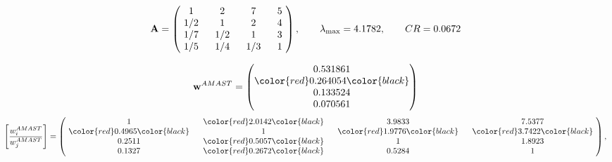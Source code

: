 \begin{example}
\begin{equation*}
\mathbf{A} =
\begin{pmatrix}
$\,\,$ 1 $\,\,$ & $\,\,$2$\,\,$ & $\,\,$7$\,\,$ & $\,\,$5 $\,\,$ \\
$\,\,$ 1/2$\,\,$ & $\,\,$ 1 $\,\,$ & $\,\,$2$\,\,$ & $\,\,$4 $\,\,$ \\
$\,\,$ 1/7$\,\,$ & $\,\,$ 1/2$\,\,$ & $\,\,$ 1 $\,\,$ & $\,\,$3 $\,\,$ \\
$\,\,$ 1/5$\,\,$ & $\,\,$ 1/4$\,\,$ & $\,\,$ 1/3$\,\,$ & $\,\,$ 1  $\,\,$ \\
\end{pmatrix},
\qquad
\lambda_{\max} =
4.1782,
\qquad
CR = 0.0672
\end{equation*}

\begin{equation*}
\mathbf{w}^{AMAST} =
\begin{pmatrix}
0.531861\\
\color{red} 0.264054\color{black} \\
0.133524\\
0.070561
\end{pmatrix}\end{equation*}
\begin{equation*}
\left[ \frac{{w}^{AMAST}_i}{{w}^{AMAST}_j} \right] =
\begin{pmatrix}
$\,\,$ 1 $\,\,$ & $\,\,$\color{red} 2.0142\color{black} $\,\,$ & $\,\,$3.9833$\,\,$ & $\,\,$7.5377$\,\,$ \\
$\,\,$\color{red} 0.4965\color{black} $\,\,$ & $\,\,$ 1 $\,\,$ & $\,\,$\color{red} 1.9776\color{black} $\,\,$ & $\,\,$\color{red} 3.7422\color{black}   $\,\,$ \\
$\,\,$0.2511$\,\,$ & $\,\,$\color{red} 0.5057\color{black} $\,\,$ & $\,\,$ 1 $\,\,$ & $\,\,$1.8923 $\,\,$ \\
$\,\,$0.1327$\,\,$ & $\,\,$\color{red} 0.2672\color{black} $\,\,$ & $\,\,$0.5284$\,\,$ & $\,\,$ 1  $\,\,$ \\
\end{pmatrix},
\end{equation*}


\end{example}
